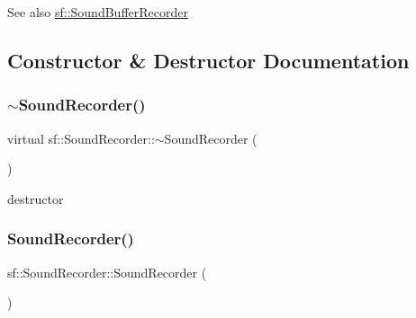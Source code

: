 \begin{DoxySeeAlso}{See also}
\mbox{\hyperlink{classsf_1_1_sound_buffer_recorder}{sf\+::\+Sound\+Buffer\+Recorder}} \begin{DoxyVerb}\end{DoxyVerb}
 
\end{DoxySeeAlso}


\subsection{Constructor \& Destructor Documentation}
\mbox{\label{classsf_1_1_sound_recorder_acc599e61aaa47edaae88cf43f0a43549}} 
\subsubsection{\texorpdfstring{$\sim$SoundRecorder()}{~SoundRecorder()}}
{\footnotesize\ttfamily virtual sf\+::\+Sound\+Recorder\+::$\sim$\+Sound\+Recorder (\begin{DoxyParamCaption}{ }\end{DoxyParamCaption})\hspace{0.3cm}{\ttfamily [virtual]}}



destructor 

\begin{DoxyVerb}\end{DoxyVerb}
 \mbox{\label{classsf_1_1_sound_recorder_a50ebad413c4f157408a0fa49f23212a9}} 
\subsubsection{\texorpdfstring{SoundRecorder()}{SoundRecorder()}}
{\footnotesize\ttfamily sf\+::\+Sound\+Recorder\+::\+Sound\+Recorder (\begin{DoxyParamCaption}{ }\end{DoxyParamCaption})\hspace{0.3cm}{\ttfamily [protected]}}



